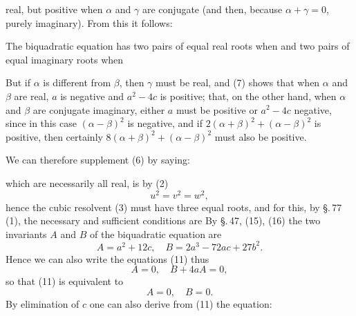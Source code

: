 real, but positive when $\alpha$ and $\gamma$ are conjugate (and then, because $\alpha+\gamma=0$, purely imaginary). From this it follows:

The biquadratic equation has two pairs of equal real roots when
and two pairs of equal imaginary roots when

But if $\alpha$ is different from $\beta$, then $\gamma$ must be real, and (7) shows that when $\alpha$ and $\beta$ are real, $a$ is negative and $a^2-4c$ is positive; that, on the other hand, when $\alpha$ and $\beta$ are conjugate imaginary, either $a$ must be positive or $a^2-4c$ negative, since in this case $(\alpha-\beta)^2$ is negative, and if $2(\alpha+\beta)^2+(\alpha-\beta)^2$ is positive, then certainly $8(\alpha+\beta)^2+(\alpha-\beta)^2$ must also be positive.

We can therefore supplement (6) by saying:


 which are necessarily all real, is by (2)
\[
u^2 = v^2 = w^2,
\]
hence the cubic resolvent (3) must have three equal roots, and for this, by \S.\,77 (1), the necessary and sufficient conditions are
By \S.\,47, (15), (16) the two invariants $A$ and $B$ of the biquadratic equation are
\[
A = a^2+12c, \quad B = 2a^3-72ac+27b^2.
\]
Hence we can also write the equations (11) thus
\[
A = 0, \quad B+4aA = 0,
\]
so that (11) is equivalent to
\[
A = 0, \quad B = 0.
\]
By elimination of $c$ one can also derive from (11) the equation:
